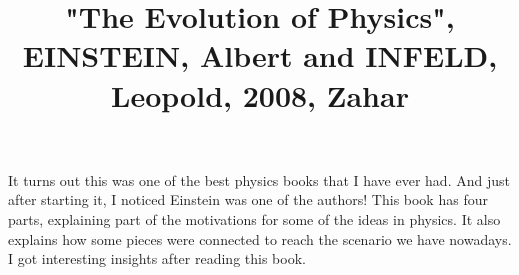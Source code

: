 \documentclass{cornell}
\begin{document}
 

\title{
    \vspace{-3em}
        \begin{tcolorbox}[colframe=white,opacityback=0]
            \begin{tcolorbox}
                \Huge\sffamily "The Evolution of Physics", EINSTEIN, Albert and INFELD, Leopold, 2008, Zahar
            \end{tcolorbox}
        \end{tcolorbox}
    \vspace{-3em}
}
\maketitle

\begin{tcolorbox}
\end{tcolorbox}


\noindent
It turns out this was one of the best physics books that I have ever had. And just after starting it, I noticed Einstein was one of the authors! This book has four parts, explaining part of the motivations for some of the ideas in physics. It also explains how some pieces were connected to reach the scenario we have nowadays. I got interesting insights after reading this book.
\end{document}
